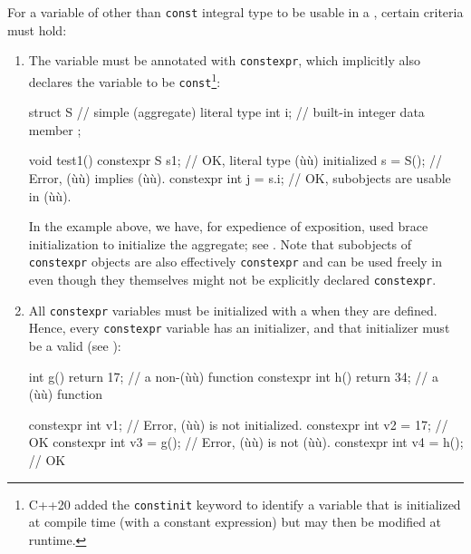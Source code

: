 For a variable of other than \lstinline!const! integral type to be usable
in a , certain criteria must hold:

\begin{enumerate}
\item{The variable must be annotated with \lstinline!constexpr!, which implicitly also declares the variable to be \lstinline!const!\footnote{C++20 added the \lstinline!constinit! keyword to identify a variable that is initialized at compile time (with a constant expression) but may then be modified at runtime.}:

\begin{emcppslisting}
struct S  // simple (aggregate) literal type
{
    int i;  // built-in integer data member
};

void test1()
{
    constexpr S s{1};       // OK, literal type (ù{}ù) initialized
    s = S();                // Error, (ù{}ù) implies (ù{}ù).
    constexpr int j = s.i;  // OK, subobjects are usable in (ù{}ù).
}
\end{emcppslisting}

\noindent In the example above, we have, for expedience of exposition, used brace
initialization to initialize the aggregate; see . Note that subobjects of \lstinline!constexpr! objects
are also effectively \lstinline!constexpr! and can be used freely in
 even though they themselves might not be
explicitly declared \lstinline!constexpr!.}

\item{All \lstinline!constexpr! variables must be initialized with a  when they are defined. Hence, every \lstinline!constexpr! variable has an initializer, and that initializer must be a valid  (see ):

\begin{emcppslisting}
          int g() { return 17; }  // a non-(ù{}ù) function
constexpr int h() { return 34; }  // a (ù{}ù) function

constexpr int v1;        // Error, (ù{}ù) is not initialized.
constexpr int v2 = 17;   // OK
constexpr int v3 = g();  // Error, (ù{}ù) is not (ù{}ù).
constexpr int v4 = h();  // OK


\end{emcppslisting}}
\end{enumerate}
